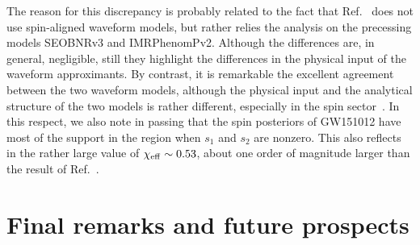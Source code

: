 The reason for this discrepancy is probably related to the fact that Ref.~\cite{LIGOScientific:2018mvr}
does not use spin-aligned waveform models, but rather relies the analysis on 
the precessing models SEOBNRv3 and IMRPhenomPv2. Although the differences 
are, in general, negligible, still they highlight the differences in the physical input of 
the waveform approximants. By contrast, it is remarkable the excellent agreement between the
two waveform models, although the physical input and the analytical structure of the
two models is rather different, especially in the spin sector~\cite{Rettegno:2019tzh}.
In this respect, we also note in passing that the spin posteriors of GW151012 have
most of the support in the region when $s_1$ and $s_2$ are nonzero. This also
reflects in the rather large value of $\chi_{\rm eff}\sim 0.53$, about one order of magnitude
larger than the result of Ref.~\cite{LIGOScientific:2018mvr}.

\section{Final remarks and future prospects}
\label{sec:end}


